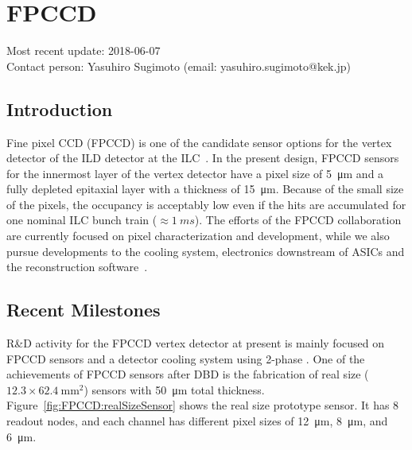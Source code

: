 \section{FPCCD}
Most recent update: 2018-06-07 \\
Contact person: Yasuhiro Sugimoto (email: yasuhiro.sugimoto@kek.jp)
\subsection{Introduction}
    Fine pixel CCD (FPCCD) is one of the candidate sensor options for the vertex detector of the ILD detector at the ILC~\cite{Sugimoto:2005ru,2009arXiv0902.2067S,2012arXiv1202.5832S}. In the present design, FPCCD sensors for the innermost layer of the vertex detector have a pixel size of \SI{5}{\micro\meter} and a fully depleted epitaxial layer with a thickness of \SI{15}{\micro\meter}. Because of the small size of the pixels, the occupancy is acceptably low even if the hits are accumulated for one nominal ILC bunch train ($\approx\SI{1}{ms}$).
    The efforts of the FPCCD collaboration are currently focused on pixel characterization and development, while we also pursue developments to the cooling system, electronics downstream of ASICs and the reconstruction software~\cite{Mori:2014xta}.
\subsection{Recent Milestones}
R\&D activity for the FPCCD vertex detector at present is mainly focused on FPCCD sensors and a detector cooling system using 2-phase .
One of the achievements of FPCCD sensors after DBD is the fabrication of real size ($12.3 \times \SI{62.4}{\mathrm{mm}^2}$) sensors with \SI{50}{\micro\meter} total thickness. Figure~\ref{fig:FPCCD:realSizeSensor} shows the real size prototype sensor. It has 8 readout nodes, and each channel has different pixel sizes of \SI{12}{\micro\meter}, \SI{8}{\micro\meter}, and \SI{6}{\micro\meter}.

